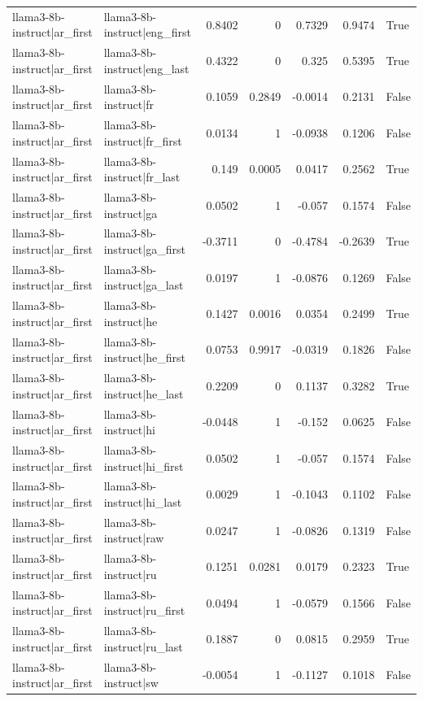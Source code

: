 \begin{table}
\begin{tabular}{l l r r r r l}
llama3-8b-instruct|ar_first & llama3-8b-instruct|eng_first & 0.8402 & 0 & 0.7329 & 0.9474 & True \\
llama3-8b-instruct|ar_first & llama3-8b-instruct|eng_last & 0.4322 & 0 & 0.325 & 0.5395 & True \\
llama3-8b-instruct|ar_first & llama3-8b-instruct|fr & 0.1059 & 0.2849 & -0.0014 & 0.2131 & False \\
llama3-8b-instruct|ar_first & llama3-8b-instruct|fr_first & 0.0134 & 1 & -0.0938 & 0.1206 & False \\
llama3-8b-instruct|ar_first & llama3-8b-instruct|fr_last & 0.149 & 0.0005 & 0.0417 & 0.2562 & True \\
llama3-8b-instruct|ar_first & llama3-8b-instruct|ga & 0.0502 & 1 & -0.057 & 0.1574 & False \\
llama3-8b-instruct|ar_first & llama3-8b-instruct|ga_first & -0.3711 & 0 & -0.4784 & -0.2639 & True \\
llama3-8b-instruct|ar_first & llama3-8b-instruct|ga_last & 0.0197 & 1 & -0.0876 & 0.1269 & False \\
llama3-8b-instruct|ar_first & llama3-8b-instruct|he & 0.1427 & 0.0016 & 0.0354 & 0.2499 & True \\
llama3-8b-instruct|ar_first & llama3-8b-instruct|he_first & 0.0753 & 0.9917 & -0.0319 & 0.1826 & False \\
llama3-8b-instruct|ar_first & llama3-8b-instruct|he_last & 0.2209 & 0 & 0.1137 & 0.3282 & True \\
llama3-8b-instruct|ar_first & llama3-8b-instruct|hi & -0.0448 & 1 & -0.152 & 0.0625 & False \\
llama3-8b-instruct|ar_first & llama3-8b-instruct|hi_first & 0.0502 & 1 & -0.057 & 0.1574 & False \\
llama3-8b-instruct|ar_first & llama3-8b-instruct|hi_last & 0.0029 & 1 & -0.1043 & 0.1102 & False \\
llama3-8b-instruct|ar_first & llama3-8b-instruct|raw & 0.0247 & 1 & -0.0826 & 0.1319 & False \\
llama3-8b-instruct|ar_first & llama3-8b-instruct|ru & 0.1251 & 0.0281 & 0.0179 & 0.2323 & True \\
llama3-8b-instruct|ar_first & llama3-8b-instruct|ru_first & 0.0494 & 1 & -0.0579 & 0.1566 & False \\
llama3-8b-instruct|ar_first & llama3-8b-instruct|ru_last & 0.1887 & 0 & 0.0815 & 0.2959 & True \\
llama3-8b-instruct|ar_first & llama3-8b-instruct|sw & -0.0054 & 1 & -0.1127 & 0.1018 & False \\

\end{tabular}
\end{table}
